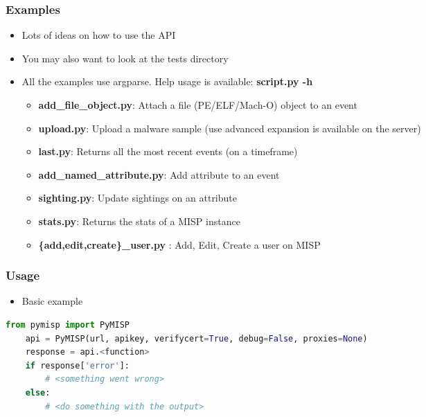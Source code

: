 \begin{frame}[fragile]
    \frametitle{Examples}
    \begin{itemize}
        \item Lots of ideas on how to use the API
        \item You may also want to look at the tests directory
        \item All the examples use argparse. Help usage is available: {\bf script.py -h}
        \begin{itemize}
            \item {\bf add\_file\_object.py}: Attach a file (PE/ELF/Mach-O) object to an event
            \item {\bf upload.py}: Upload a malware sample (use advanced expansion is available on the server)
            \item {\bf last.py}: Returns all the most recent events (on a timeframe)
            \item {\bf add\_named\_attribute.py}: Add attribute to an event
            \item {\bf sighting.py}: Update sightings on an attribute
            \item {\bf stats.py}: Returns the stats of a MISP instance
            \item {\bf \{add,edit,create\}\_user.py} : Add, Edit, Create a user on MISP
        \end{itemize}
    \end{itemize}
\end{frame}

\begin{frame}[fragile]
    \frametitle{Usage}
    \begin{itemize}
        \item Basic example
    \end{itemize}
        \begin{adjustbox}{width=\textwidth,height=2cm,keepaspectratio}
            \begin{lstlisting}[language=python,firstnumber=1]
    from pymisp import PyMISP
    api = PyMISP(url, apikey, verifycert=True, debug=False, proxies=None)
    response = api.<function>
    if response['error']:
        # <something went wrong>
    else:
        # <do something with the output>
            \end{lstlisting}
        \end{adjustbox}
\end{frame}


